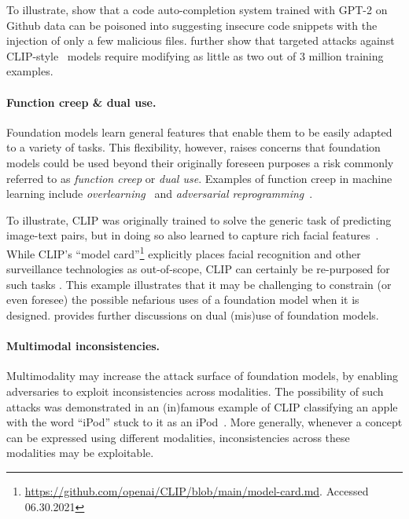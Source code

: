 To illustrate, \citet{schuster2021you} show that a code auto-completion system trained with GPT-2 on Github data can be poisoned into suggesting insecure code snippets with the injection of only a few malicious files.
\citet{carlini2021poisoning} further show that targeted attacks against CLIP-style~\citep{radford2021learning} models require modifying as little as two out of 3 million training examples.


\paragraph{Function creep \& dual use.}
Foundation models learn general features that enable them to be easily adapted to a variety of tasks. 
This flexibility, however, raises  concerns that foundation models could be used beyond their originally foreseen purposes%
\dash{}a risk commonly referred to as \emph{function creep} or \emph{dual use}.
Examples of function creep in machine learning include \emph{overlearning}~\citep{song2019overlearning} and \emph{adversarial reprogramming}~\citep{elsayed2018adversarial}.

To illustrate, CLIP was originally trained to solve the generic task of predicting image-text pairs, but in doing so also learned to capture rich facial features~\citep{goh2021multimodal}. 
While CLIP's ``model card''\footnote{\url{https://github.com/openai/CLIP/blob/main/model-card.md}. Accessed 06.30.2021} explicitly places facial recognition and other surveillance technologies as out-of-scope, CLIP can certainly be re-purposed for such tasks \citep{radiya2021data}.
This example illustrates that it may be challenging to constrain (or even foresee) the possible nefarious uses of a foundation model when it is designed.  provides further discussions on dual (mis)use of foundation models.

\paragraph{Multimodal inconsistencies.}
Multimodality may increase the attack surface of foundation models, by enabling adversaries to exploit inconsistencies across modalities.
The possibility of such attacks was demonstrated in an (in)famous example of CLIP classifying an apple with the word ``iPod'' stuck to it as an iPod~\citep{goh2021multimodal}. 
More generally, whenever a concept can be expressed using different modalities, inconsistencies across these modalities may be exploitable.

